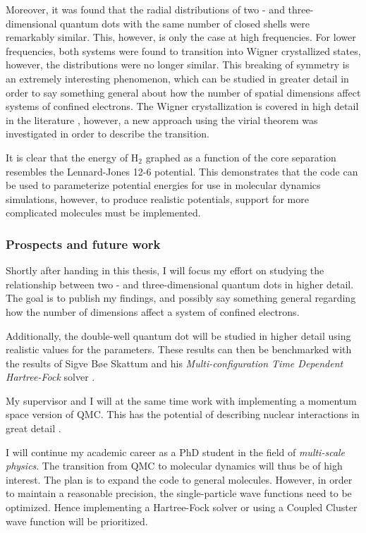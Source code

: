 Moreover, it was found that the radial distributions of two - and three-dimensional quantum dots with the same number of closed shells were remarkably similar. This, however, is only the case at high frequencies. For lower frequencies, both systems were found to transition into Wigner crystallized states, however, the distributions were no longer similar. This breaking of symmetry is an extremely interesting phenomenon, which can be studied in greater detail in order to say something general about how the number of spatial dimensions affect systems of confined electrons. The Wigner crystallization is covered in high detail in the literature \cite{WignerTransport, WignerPathTo, WignerSymmetryBreak, WignerFloating, Wigner2DQD}, however, a new approach using the virial theorem was investigated in order to describe the transition.  

It is clear that the energy of $\mathrm{H_2}$ graphed as a function of the core separation resembles the Lennard-Jones 12-6 potential. This demonstrates that the code can be used to parameterize potential energies for use in molecular dynamics simulations, however, to produce realistic potentials, support for more complicated molecules must be implemented. 

\subsubsection{Prospects and future work}

Shortly after handing in this thesis, I will focus my effort on studying the relationship between two - and three-dimensional quantum dots in higher detail. The goal is to publish my findings, and possibly say something general regarding how the number of dimensions affect a system of confined electrons.

Additionally, the double-well quantum dot will be studied in higher detail using realistic values for the parameters. These results can then be benchmarked with the results of Sigve Bøe Skattum and his \textit{Multi-configuration Time Dependent Hartree-Fock} solver \cite{Sigve}.

My supervisor and I will at the same time work with implementing a momentum space version of QMC. This has the potential of describing nuclear interactions in great detail \cite{momentspaceQMC}. 

I will continue my academic career as a PhD student in the field of \textit{multi-scale physics}. The transition from QMC to molecular dynamics will thus be of high interest. The plan is to expand the code to general molecules. However, in order to maintain a reasonable precision, the single-particle wave functions need to be optimized. Hence implementing a Hartree-Fock solver \cite{Shavitt} or using a Coupled Cluster wave function \cite{CCSD_WF} will be prioritized.


